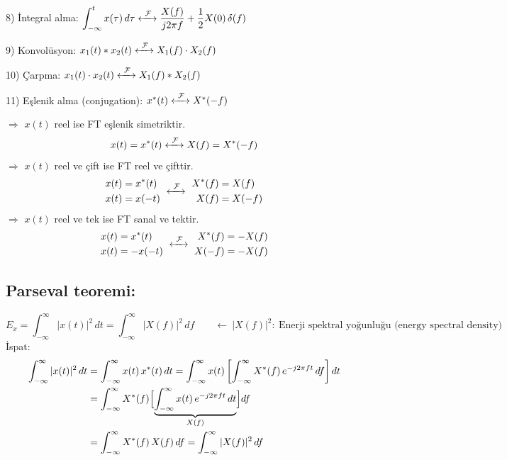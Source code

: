\documentclass[11pt,a4paper]{article}
\begin{document}
8) İntegral alma: \quad $\displaystyle\int_{-\infty}^{t} x(\tau)\,d\tau \xleftrightarrow{\ \mathcal{F}\ } \frac{X(f)}{j2\pi f}+\frac{1}{2}X(0)\,\delta(f)$

9) Konvolüsyon: \quad $x_1(t)*x_2(t) \xleftrightarrow{\ \mathcal{F}\ } X_1(f)\cdot X_2(f)$

10) Çarpma: \quad $x_1(t)\cdot x_2(t) \xleftrightarrow{\ \mathcal{F}\ } X_1(f)*X_2(f)$

11) Eşlenik alma (conjugation): \quad $x^*(t) \xleftrightarrow{\ \mathcal{F}\ } X^*(-f)$

$\Rightarrow$ $x(t)$ reel ise FT eşlenik simetriktir.
\[ x(t)=x^*(t) \xleftrightarrow{\ \mathcal{F}\ } X(f)=X^*(-f) \]
$\Rightarrow$ $x(t)$ reel ve çift ise FT reel ve çifttir.
\[ \begin{aligned} x(t)&=x^*(t)\\ x(t)&=x(-t)\end{aligned} \ \xleftrightarrow{\ \mathcal{F}\ }\ \begin{aligned} X^*(f)&=X(f)\\ X(f)&=X(-f)\end{aligned} \]
$\Rightarrow$ $x(t)$ reel ve tek ise FT sanal ve tektir.
\[ \begin{aligned} x(t)&=x^*(t)\\ x(t)&=-x(-t)\end{aligned} \ \xleftrightarrow{\ \mathcal{F}\ }\ \begin{aligned} X^*(f)&=-X(f)\\ X(-f)&=-X(f)\end{aligned} \]

\subsection{Parseval teoremi:}
\[ E_x=\int_{-\infty}^{\infty} |x(t)|^2\,dt=\int_{-\infty}^{\infty} |X(f)|^2\,df \qquad\longleftarrow\ |X(f)|^2:\ \text{Enerji spektral yoğunluğu (energy spectral density)} \]
İspat:
\begin{align*}
\int_{-\infty}^{\infty} |x(t)|^2\,dt &= \int_{-\infty}^{\infty} x(t)\,x^*(t)\,dt=\int_{-\infty}^{\infty} x(t)\left[\int_{-\infty}^{\infty} X^*(f)\,e^{-j2\pi ft}\,df\right]dt\\
&= \int_{-\infty}^{\infty} X^*(f)\Bigl[\underbrace{\int_{-\infty}^{\infty} x(t)\,e^{-j2\pi ft}\,dt}_{X(f)}\Bigr]df\\
&= \int_{-\infty}^{\infty} X^*(f)\,X(f)\,df=\int_{-\infty}^{\infty} |X(f)|^2\,df
\end{align*}
\end{document}
